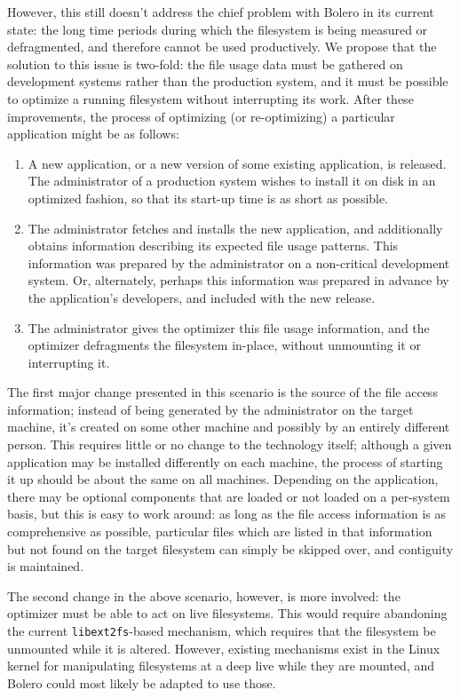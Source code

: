 \documentclass[10pt,twocolumn,letterpaper]{article}
\begin{document}
However, this still doesn't address the chief problem with Bolero in its current state: the long time periods during which the filesystem is being measured or defragmented, and therefore cannot be used productively. We propose that the solution to this issue is two-fold: the file usage data must be gathered on development systems rather than the production system, and it must be possible to optimize a running filesystem without interrupting its work. After these improvements, the process of optimizing (or re-optimizing) a particular application might be as follows:
\begin{enumerate}
\item A new application, or a new version of some existing application, is released. The administrator of a production system wishes to install it on disk in an optimized fashion, so that its start-up time is as short as possible.
\item The administrator fetches and installs the new application, and additionally obtains information describing its expected file usage patterns. This information was prepared by the administrator on a non-critical development system. Or, alternately, perhaps this information was prepared in advance by the application's developers, and included with the new release.
\item The administrator gives the optimizer this file usage information, and the optimizer defragments the filesystem in-place, without unmounting it or interrupting it.
\end{enumerate}

The first major change presented in this scenario is the source of the file access information; instead of being generated by the administrator on the target machine, it's created on some other machine and possibly by an entirely different person. This requires little or no change to the technology itself; although a given application may be installed differently on each machine, the process of starting it up should be about the same on all machines. Depending on the application, there may be optional components that are loaded or not loaded on a per-system basis, but this is easy to work around: as long as the file access information is as comprehensive as possible, particular files which are listed in that information but not found on the target filesystem can simply be skipped over, and contiguity is maintained.

The second change in the above scenario, however, is more involved: the optimizer must be able to act on live filesystems. This would require abandoning the current \texttt{libext2fs}-based mechanism, which requires that the filesystem be unmounted while it is altered. However, existing mechanisms exist in the Linux kernel for manipulating filesystems at a deep live while they are mounted\cite{ext3online}, and Bolero could most likely be adapted to use those.
\end{document}
